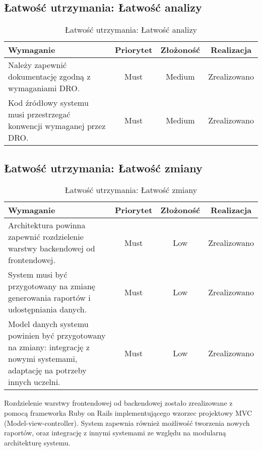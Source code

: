 \subsection{Łatwość utrzymania: Łatwość analizy}

\begin{table}[H]
\centering
\begin{tabular}{ | p{8cm} | c | c | c | }
\hline
\textbf{Wymaganie} & \textbf{Priorytet} & \textbf{Złożoność} & \textbf{Realizacja} \\ \hline
Należy zapewnić dokumentację zgodną z wymaganiami DRO.
 & Must & Medium & Zrealizowano \\ \hline
Kod źródłowy systemu musi przestrzegać konwencji wymaganej przez DRO. & Must & Medium & Zrealizowano \\ \hline
\end{tabular}
\caption{Łatwość utrzymania: Łatwość analizy}\label{tab:reqs}
\end{table}

\subsection{Łatwość utrzymania: Łatwość zmiany}

\begin{table}[H]
\centering
\begin{tabular}{ | p{8cm} | c | c | c | }
\hline
\textbf{Wymaganie} & \textbf{Priorytet} & \textbf{Złożoność} & \textbf{Realizacja} \\ \hline
Architektura powinna zapewnić rozdzielenie warstwy backendowej od frontendowej.
 & Must & Low & Zrealizowano \\ \hline
System musi być przygotowany na zmianę generowania raportów i udostępniania danych. & Must & Low & Zrealizowano \\ \hline
Model danych systemu powinien być przygotowany na zmiany: integrację z nowymi systemami, adaptację na potrzeby innych uczelni. & Must & Low & Zrealizowano \\ \hline
\end{tabular}
\caption{Łatwość utrzymania: Łatwość zmiany}\label{tab:reqs}
\end{table}

Rozdzielenie warstwy frontendowej od backendowej zostało zrealizowane z pomocą frameworka Ruby on Rails implementującego wzorzec projektowy MVC (Model-view-controller). System zapewnia również możliwość tworzenia nowych raportów, oraz integrację z innymi systemami ze względu na modularną architekturę systemu.

